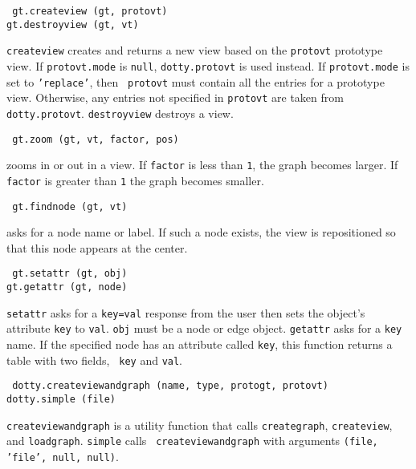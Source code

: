 \begin{flushleft}\tt
gt.createview (gt, protovt)\\
gt.destroyview (gt, vt)\\
\end{flushleft}\vspace{-2\itemsep}
{\tt createview} creates and returns a new view based on the {\tt protovt}
prototype view. If {\tt protovt.mode} is {\tt null}, {\tt dotty.protovt} is
used instead. If {\tt protovt.mode} is set to {\tt 'replace'}, then {\tt
protovt} must contain all the entries for a prototype view. Otherwise, any
entries not specified in {\tt protovt} are taken from {\tt dotty.protovt}.
{\tt destroyview} destroys a view.

\begin{flushleft}\tt
gt.zoom (gt, vt, factor, pos)\\
\end{flushleft}\vspace{-2\itemsep}
zooms in or out in a view. If {\tt factor} is less than {\tt 1}, the graph
becomes larger. If {\tt factor} is greater than {\tt 1} the graph becomes
smaller.

\begin{flushleft}\tt
gt.findnode (gt, vt)\\
\end{flushleft}\vspace{-2\itemsep}
asks for a node name or label. If such a node exists, the view is repositioned
so that this node appears at the center.

\begin{flushleft}\tt
gt.setattr (gt, obj)\\
gt.getattr (gt, node)\\
\end{flushleft}\vspace{-2\itemsep}
{\tt setattr} asks for a {\tt key=val} response from the user then sets the
object's attribute {\tt key} to {\tt val}. {\tt obj} must be a node or edge
object. {\tt getattr} asks for a {\tt key} name. If the specified node has an
attribute called {\tt key}, this function returns a table with two fields, {\tt
key} and {\tt val}.

\begin{flushleft}\tt
dotty.createviewandgraph (name, type, protogt, protovt)\\
dotty.simple (file)\\
\end{flushleft}\vspace{-2\itemsep}
{\tt createviewandgraph} is a utility function that calls {\tt creategraph},
{\tt createview}, and {\tt loadgraph}. {\tt simple} calls {\tt
createviewandgraph} with arguments {\tt (file, 'file', null, null)}.

